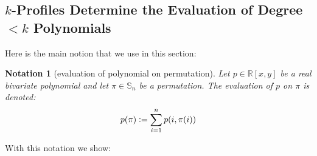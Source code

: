 \documentclass{article}
\newtheorem{notation}[theorem]{Notation}
\newcommand{\Sn}{\mathbb{S}_n}
\newcommand{\RR}{\mathbb{R}}
\newcommand{\eqdef}{\vcentcolon=}
\theoremstyle{remark}
\theoremstyle{plain}
\begin{document}
\subsection{\texorpdfstring{$k$}{k}-Profiles Determine the Evaluation of Degree \texorpdfstring{$< k$}{<k} Polynomials}
\label{subsect:k_prof_determines_deg_k_polys}

Here is the main notion that we use in this section:

\begin{notation}[evaluation of polynomial on permutation]
    \label{notn:eval_poly_perm}
    Let $p \in \RR[x,y]$ be a real bivariate polynomial and let $\pi \in \Sn$ be a permutation. The evaluation of $p$ on $\pi$ is denoted:
    \[
        p(\pi) \eqdef \sum_{i=1}^n p(i, \pi(i))
    \]    
\end{notation}  

With this notation we show:
\end{document}
